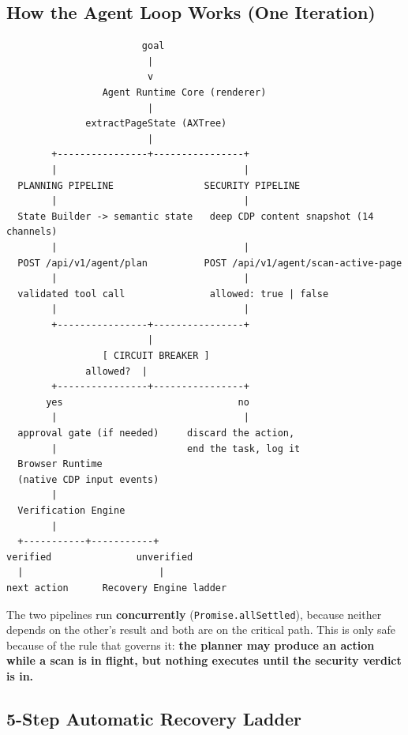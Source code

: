 \documentclass[11pt,a4paper]{article}
\begin{document}
\subsection{How the Agent Loop Works (One Iteration)}

\begin{lstlisting}
                        goal
                         |
                         v
                 Agent Runtime Core (renderer)
                         |
              extractPageState (AXTree)
                         |
        +----------------+----------------+
        |                                 |
  PLANNING PIPELINE                SECURITY PIPELINE
        |                                 |
  State Builder -> semantic state   deep CDP content snapshot (14 channels)
        |                                 |
  POST /api/v1/agent/plan          POST /api/v1/agent/scan-active-page
        |                                 |
  validated tool call               allowed: true | false
        |                                 |
        +----------------+----------------+
                         |
                 [ CIRCUIT BREAKER ]
              allowed?  |
        +----------------+----------------+
       yes                               no
        |                                 |
  approval gate (if needed)     discard the action,
        |                       end the task, log it
  Browser Runtime
  (native CDP input events)
        |
  Verification Engine
        |
  +-----------+-----------+
verified               unverified
  |                        |
next action      Recovery Engine ladder
\end{lstlisting}

The two pipelines run \textbf{concurrently} (\texttt{Promise.allSettled}), because neither depends on the other's result and both are on the critical path. This is only safe because of the rule that governs it: \textbf{the planner may produce an action while a scan is in flight, but nothing executes until the security verdict is in.}

\subsection{5-Step Automatic Recovery Ladder}
\end{document}
